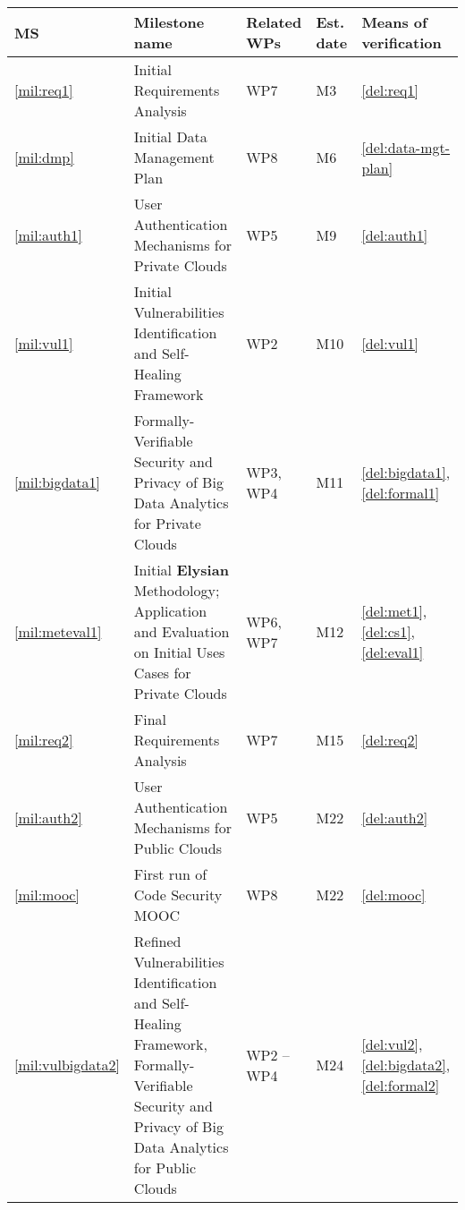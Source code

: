 \documentclass[a4paper,11pt]{article}
\newcommand{\project}[1]{\textbf{#1}\xspace}
\newcommand{\SECURITY}{\project{Elysian}}
\newcommand{\TheProject}{\SECURITY}
\begin{document}
\bigskip

\renewcommand{\thems}{MS\arabic{ms}}
\begin{minipage}{\textwidth}
\begin{center}
 \begin{tabular*}{\textwidth}{|p{1cm}|p{10.3cm}|p{1.2cm}|p{0.6cm}|p{2.7cm}|}  \hline
 \textbf{MS} & \textbf{Milestone name} & \textbf{Related WPs} & \textbf{Est. date} & \textbf{Means of
   verification} \\ %
\hline
\ref{mil:req1} & Initial Requirements Analysis & WP7 & M3 & \ref{del:req1} \\
   \hline
 \ref{mil:dmp} & Initial Data Management Plan & WP8 & M6 & \ref{del:data-mgt-plan} \\
   \hline
\ref{mil:auth1} & User Authentication Mechanisms for Private Clouds & WP5 & M9 & \ref{del:auth1} \\
   \hline
   \ref{mil:vul1} & Initial Vulnerabilities Identification and Self-Healing Framework & WP2 & M10 & \ref{del:vul1} \\
   \hline
   \ref{mil:bigdata1} & Formally-Verifiable Security and Privacy of Big Data Analytics for Private Clouds & WP3, WP4 & M11 & \ref{del:bigdata1}, \ref{del:formal1} \\
   \hline
   \ref{mil:meteval1} & Initial \TheProject{} Methodology; Application and Evaluation on Initial Uses Cases for Private Clouds & WP6, WP7 & M12 & \ref{del:met1}, \ref{del:cs1}, \ref{del:eval1} \\
   \hline
   \ref{mil:req2} & Final Requirements Analysis & WP7 & M15 & \ref{del:req2} \\
   \hline
   \ref{mil:auth2} & User Authentication Mechanisms for Public Clouds & WP5 & M22 & \ref{del:auth2} \\
   \hline
   \ref{mil:mooc} & First run of Code Security MOOC & WP8 & M22 & \ref{del:mooc} \\
   \hline
   \ref{mil:vulbigdata2} & Refined Vulnerabilities Identification and Self-Healing Framework, Formally-Verifiable Security and Privacy of Big Data Analytics for Public Clouds & WP2 -- WP4 & M24 & \ref{del:vul2}, \ref{del:bigdata2}, \ref{del:formal2} \\

\end{tabular*}
\end{center}
\end{minipage}
\end{document}
